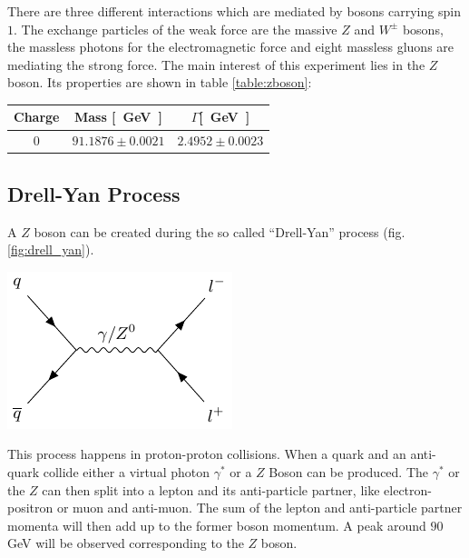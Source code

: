 \documentclass[12pt, a4paper, bibliography=totoc]{scrartcl}
\begin{document}
\begin{multicols}{2}
There are three different interactions which are mediated by bosons carrying spin $1$.
The exchange particles of the weak force are the massive $Z$ and $W^{\pm}$ bosons, the massless photons for the electromagnetic force and eight massless gluons are mediating the strong force. 
The main interest of this experiment lies in the $Z$ boson.
Its properties are shown in table \ref{table:zboson}:
        \begin{center}
            \begin{tabular*}{\linewidth}{c c c}
        \toprule
                Charge & Mass \si{[GeV]} & $\Gamma$\si{[GeV]}\\%
        \midrule
                \small{0} & \small {$91.1876 \pm 0.0021$} & \small{$2.4952 \pm 0.0023$} \\
        \bottomrule
    \end{tabular*}
        \label{table:zboson}
        \end{center}


\subsection{Drell-Yan Process}
A $Z$ boson can be created during the so called ``Drell-Yan'' process (fig. \ref{fig:drell_yan}). 

    \begin{center}
\includegraphics[width=0.55\linewidth]{fig/feynman_0.pdf}
\label{fig:drell_yan}
\end{center}

This process happens in proton-proton collisions.
When a quark and an anti-quark collide either a virtual photon $\gamma^\ast$ or a $Z$ Boson can be produced. 
The $\gamma^\ast$ or the $Z$ can then split into a lepton and its anti-particle partner, like electron-positron or muon and anti-muon.
The sum of the lepton and anti-particle partner momenta will then add up to the former boson momentum. 
A peak around $90$ \si{GeV} will be observed corresponding to the $Z$ boson. 


\end{multicols}
\end{document}
